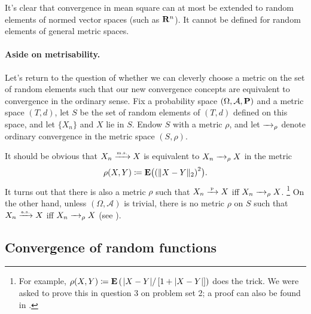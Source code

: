 \documentclass[11pt,letterpaper,reqno,oneside]{article}
\begin{document}
It's clear that convergence in mean square can at most be extended to random elements of normed vector spaces (such as $\mathbf{R}^n$). It cannot be defined for random elements of general metric spaces.



\paragraph{Aside on metrisability.}
Let's return to the question of whether we can cleverly choose a metric on the set of random elements such that our new convergence concepts are equivalent to convergence in the ordinary sense. Fix a probability space $(\Omega,\mathcal{A},\mathbf{P})$ and a metric space $(T,d)$, let $S$ be the set of random elements of $(T,d)$ defined on this space, and let $\{ X_n \}$ and $X$ lie in $S$. Endow $S$ with a metric $\rho$, and let $\xrightarrow{\;\;\;}_\rho$ denote ordinary convergence in the metric space $(S,\rho)$.

It should be obvious that $X_n \xrightarrow{{\scriptscriptstyle \mathrm{m.s.}}} X$ is equivalent to $X_n \xrightarrow{\;\;\;}_\rho X$ in the metric
%
\begin{equation*}
	\rho(X,Y) \coloneqq \mathbf{E}\bigl( \left(\lVert X-Y\rVert_2\right)^2 \bigr) .
\end{equation*}
%
It turns out that there is also a metric $\rho$ such that $X_n \xrightarrow{{\scriptscriptstyle \mathrm{\;p\;}}} X$ iff $X_n \xrightarrow{\;\;\;}_\rho X$.%
	\footnote{For example, $\rho(X,Y) \coloneqq \mathbf{E}\left( \left. \lvert X-Y\rvert \right/ \left[1+\lvert X-Y\rvert\right] \right)$ does the trick. We were asked to prove this in question 3 on problem set 2; a proof can also be found in \textcite[][Theorem 9.2.2]{Dudley2004}.}
On the other hand, unless $(\Omega,\mathcal{A})$ is trivial, there is no metric $\rho$ on $S$ such that $X_n \xrightarrow{{\scriptscriptstyle \mathrm{a.s.}}} X$ iff $X_n \xrightarrow{\;\;\;}_\rho X$ (see \textcite[][p. 289]{Dudley2004}).



\subsection{Convergence of random functions}
\label{sec:modes_of_convergence:random_functions}
\end{document}
